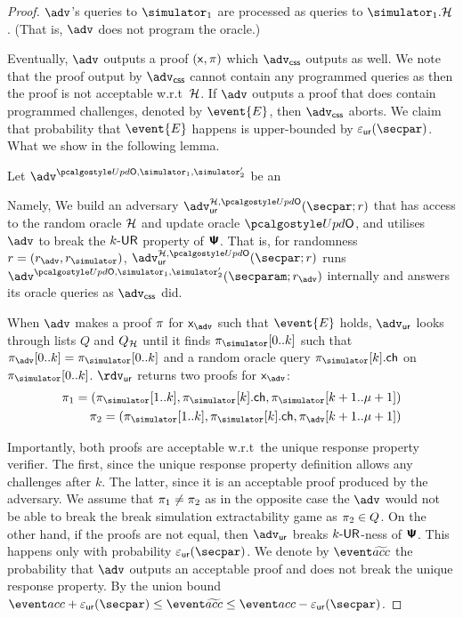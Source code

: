 \begin{proof}
	$\advse$'s queries to $\simulator_1$ are processed as queries to $\simulator_1.\ro$. (That is, $\advse$ does not program the oracle.)

	Eventually, $\advse$ outputs a proof $(\mathsf{x}, \pi)$ which $\advcss$ outputs as well. We note that the proof output by $\advcss$ cannot contain any programmed queries as then the proof is not acceptable w.r.t~$\mathcal{H}$. If $\advse$ outputs a proof that does contain programmed challenges, denoted by $\event{E}$, then $\advcss$ aborts. We claim that probability that $\event{E}$ happens is upper-bounded by $\epsur(\secpar)$. What we show in the following lemma.

	\begin{lemma}
		Let $\advse^{\initU, \simulator_1, \simulator'_2}$ be an
	\end{lemma}

	Namely, We build an adversary $\advur^{\ro, \initU} (\secpar; r)$ that has access to the random oracle $\mathcal{H}$ and update oracle $\initU$, and utilises $\advse$ to break the ${k\text{-}\mathsf{UR}}$ property of $\bm{\mathsf{\Psi}}$. That is, for randomness $r = (r_{\advse}, \rsim)$, $\advur^{\ro, \initU} (\secpar; r)$ runs $\advse^{\initU, \simulator_1, \simulator_2'}(\secparam; r_{\advse})$ internally and answers its oracle queries as $\advcss$ did.

	When $\advse$ makes a proof $\pi$ for $\inp_{\advse}$ such that $\event{E}$ holds, $\advur$ looks through lists $Q$ and $Q_{\mathcal{H}}$ until it finds $\zkproofs[0..k]$ such that $\zkproof_{\advse}[0..k] = \zkproofs[0..k]$ and a random oracle query $\zkproofs[k].\ch$ on $\zkproofs[0..k]$.
	$\rdvur$ returns two proofs for $\inp_{\advse}$:
		\begin{align*}
		\zkproof_1 = (\zkproofs[1..k],
		\zkproofs[k].\ch, \zkproofs[k + 1..\mu + 1])\\
		\zkproof_2 = (\zkproofs[1..k],
		\zkproofs[k].\ch, \zkproof_{\advse}[k + 1..\mu + 1])
		\end{align*}

	Importantly, both proofs are acceptable w.r.t~the unique response property verifier. The first, since the unique response property definition allows any challenges after $k$. The latter, since it is an acceptable proof produced by the adversary.
	We assume that $\pi_1 \neq \pi_2$ as in the opposite case the $\advse$ would not be able to break the break simulation extractability game as $\pi_2 \in Q$. On the other hand, if the proofs are not equal, then $\advur$ breaks ${k\text{-}\mathsf{UR}}$-ness of $\bm{\mathsf{\Psi}}$. This happens only with  probability $\epsur(\secpar)$. We denote by $\waccProb$ the probability that $\adv$ outputs an acceptable proof and does not break the unique response property. By the union bound $\accProb + \epsur (\secpar) \leq \waccProb \leq \accProb - \epsur (\secpar)$.



\end{proof}
